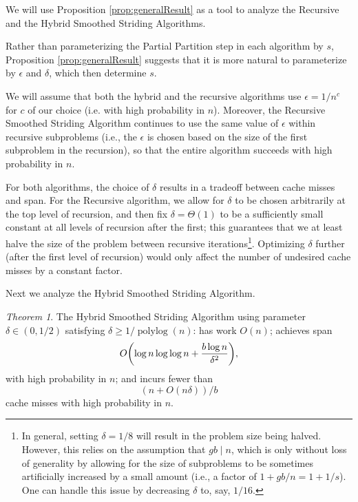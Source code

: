 \documentclass[twocolumn,10pt]{article}
\DeclarePairedDelimiter{\paren}{(}{)}
\newcommand{\polylog}{\operatorname{polylog}}
\theoremstyle{remark}
\newtheorem{theorem}{Theorem}[section]
\theoremstyle{remark}
\begin{document}
We will use Proposition \ref{prop:generalResult} as a tool to analyze the Recursive and the Hybrid Smoothed Striding Algorithms.

Rather than parameterizing the Partial Partition step in each algorithm by $s$, Proposition \ref{prop:generalResult} suggests that it is more natural to parameterize by $\epsilon$ and $\delta$, which then determine $s$.

We will assume that both the hybrid and the recursive algorithms use $\epsilon = 1/n^c$ for $c$ of our choice (i.e. with high probability in $n$). Moreover, the Recursive Smoothed Striding Algorithm continues to use the same value of $\epsilon$ within recursive subproblems (i.e., the $\epsilon$ is chosen based on the size of the first subproblem in the recursion), so that the entire algorithm succeeds with high probability in $n$.

For both algorithms, the choice of $\delta$ results in a tradeoff between cache misses and span. For the Recursive algorithm, we allow for $\delta$ to be chosen arbitrarily at the top level of recursion, and then fix $\delta  = \Theta(1)$ to be a sufficiently small constant at all levels of recursion after the first; this guarantees that we at least halve the size of the problem between recursive iterations\footnote{In general, setting $\delta = 1/8$ will result in the problem size being halved. However, this relies on the assumption that $gb \mid n$, which is only without loss of generality by allowing for the size of subproblems to be sometimes artificially increased by a small amount (i.e., a factor of $1 + gb / n = 1 + 1/s$). One can handle this issue by decreasing $\delta$ to, say, $1/16$.}. Optimizing $\delta$ further (after the first level of recursion) would only affect the number of undesired cache misses by a constant factor.




Next we analyze the Hybrid Smoothed Striding Algorithm.
\begin{theorem}
	\label{thm:fullPartition}
	The Hybrid Smoothed Striding Algorithm using parameter $\delta\in(0,1/2)$ satisfying $\delta \ge 1/\polylog(n)$: has work $O(n)$; achieves span
        $$O\paren*{\log n \log\log n +\frac{b\log n}{\delta^2}},$$
with high probability in $n$; and incurs fewer than 
$$(n+O(n\delta))/b$$
cache misses with high probability in $n$.
\end{theorem}
\end{document}

